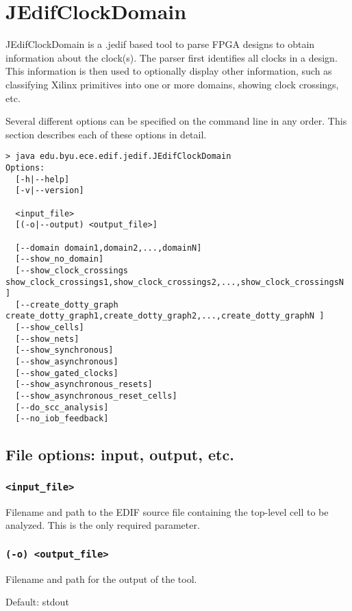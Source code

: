 
\section{JEdifClockDomain}
JEdifClockDomain is a .jedif based tool to parse FPGA designs to obtain
information about the clock(s). The parser first identifies all clocks in a
design. This information is then used to optionally display other information,
such as classifying Xilinx primitives into one or more domains, showing clock
crossings, etc.

Several different options can be specified on the command line in any order.
This section describes each of these options in detail.

\begin{verbatim}
> java edu.byu.ece.edif.jedif.JEdifClockDomain
Options:
  [-h|--help]
  [-v|--version]

  <input_file>
  [(-o|--output) <output_file>]

  [--domain domain1,domain2,...,domainN]
  [--show_no_domain]
  [--show_clock_crossings show_clock_crossings1,show_clock_crossings2,...,show_clock_crossingsN ]
  [--create_dotty_graph create_dotty_graph1,create_dotty_graph2,...,create_dotty_graphN ]
  [--show_cells]
  [--show_nets]
  [--show_synchronous]
  [--show_asynchronous]
  [--show_gated_clocks]
  [--show_asynchronous_resets]
  [--show_asynchronous_reset_cells]
  [--do_scc_analysis]
  [--no_iob_feedback]
\end{verbatim}

\subsection{File options: input, output, etc.}

\subsubsection{\texttt{<input\_file>}}
Filename and path to the EDIF source file containing the top-level cell to be
analyzed. This is the only required parameter.

\subsubsection{\texttt{(-o) <output\_file>}}
Filename and path for the output of the tool.

Default: stdout

